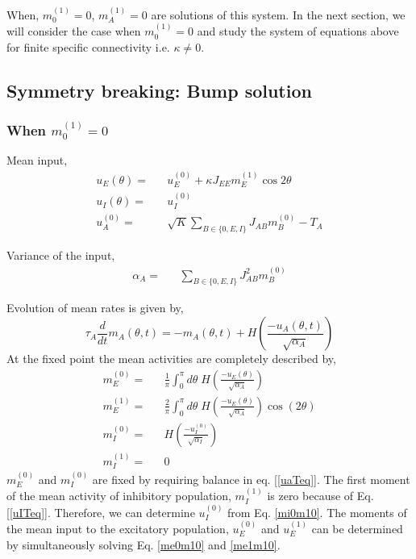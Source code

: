 When, $m_0^{(1)} = 0$, $m_A^{(1)} = 0$ are solutions of this system. In the next section, we will consider the case when $m_0^{(1)} = 0$ and study the system of equations above for finite specific connectivity i.e. $\kappa \ne 0$. 
\subsection{Symmetry breaking: Bump solution} 
\subsubsection{When  $m_0^{(1)} = 0$}
Mean input, \\
\begin{eqnarray}
u_E(\theta) =&& u^{(0)}_E + \kappa J_{EE} m_E^{(1)} \cos 2 \theta \\
u_I(\theta) =&& u^{(0)}_I \label{uITeq} \\
u^{(0)}_A =&& \sqrt{K} \sum_{B \in \lbrace 0, E, I\rbrace} J_{AB} m_B^{(0)}  - T_A\label{uaTeq} 
\end{eqnarray}

Variance of the input,\\
\begin{eqnarray}
\alpha_A =&& \sum_{B \in \lbrace 0, E, I\rbrace} J_{AB}^2 m_B^{(0)} \label{alphaE}
\end{eqnarray}

Evolution of mean rates is given by,\\
\begin{equation}
\tau_A \frac{d}{dt} m_A(\theta, t) = -m_A(\theta, t) + H\left( \frac{-u_A(\theta, t)}{\sqrt{\alpha_A}} \right)
\end{equation}
At the fixed point the mean activities are completely described by, \\
\begin{eqnarray}
m_E^{(0)} =&& \frac{1}{\pi} \int_0^\pi d\theta \; H\left( \frac{-u_E(\theta)}{\sqrt{\alpha_A}} \right) \label{me0m10}\\
m_E^{(1)} =&& \frac{2}{\pi} \int_0^\pi d\theta \; H\left( \frac{-u_E(\theta)}{\sqrt{\alpha_A}}  \right) \cos(2 \theta) \label{me1m10} \\
m_I^{(0)} =&&  H\left( \frac{-u^{(0)}_I}{\sqrt{\alpha_I}} \right) \label{mi0m10} \\
m_I^{(1)} =&& 0 
\end{eqnarray}
$m_E^{(0)}$ and $m_I^{(0)}$ are fixed by requiring balance in eq. [\ref{uaTeq}]. The first moment of the mean activity of inhibitory population, $m_I^{(1)}$ is zero because of Eq.[\ref{uITeq}]. Therefore, we can determine $u_I^{(0)}$ from Eq. \ref{mi0m10}. The moments of the mean input to the excitatory population, $u_E^{(0)}$ and $u_E^{(1)}$ can be determined by simultaneously solving Eq. \ref{me0m10} and \ref{me1m10}.
